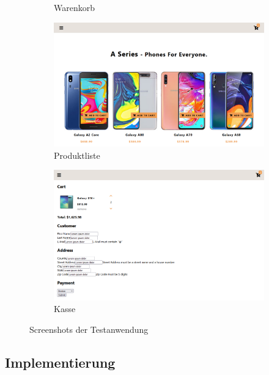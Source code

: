 \begin{figure}
\begin{subfigure}[b]{0.32\textwidth}
        \caption{Warenkorb}
        \label{fig:online-shopping-website-cart}
    \end{subfigure}
    
    \begin{subfigure}[b]{0.9\textwidth}
        \centering
        \includegraphics[width=\textwidth]{pictures/Products_Half.png}
        \caption{Produktliste}
        \label{fig:online-shopping-website-product-list}
    \end{subfigure}
    \begin{subfigure}[b]{0.9\textwidth}
        \centering
        \includegraphics[width=\textwidth]{pictures/Checkout.png}
        \caption{Kasse}
        \label{fig:online-shopping-website-checkout}
    \end{subfigure}

    \caption{Screenshots der Testanwendung}
    \label{fig:online-shopping-website}
\end{figure}

\subsection*{Implementierung}

